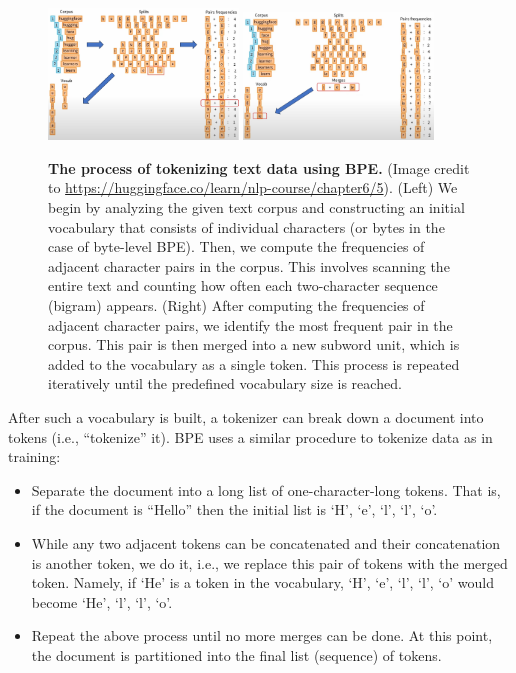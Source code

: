 \documentclass[../../book-main.tex]{subfiles}
\begin{document}
\begin{figure}
    \centering
    \includegraphics[width=0.45\textwidth]{figs_chap7/BPE1}\hspace{0.6in} 
    \includegraphics[width=0.45\textwidth]{figs_chap7/BPE2} 
    \caption{\small {\bf The process of tokenizing text data using BPE.} (Image credit to \url{https://huggingface.co/learn/nlp-course/chapter6/5}). (Left) We begin by analyzing the given text corpus and constructing an initial vocabulary that consists of individual characters (or bytes in the case of byte-level BPE). Then, we compute the frequencies of adjacent character pairs in the corpus. This involves scanning the entire text and counting how often each two-character sequence (bigram) appears. (Right) After computing the frequencies of adjacent character pairs, we identify the most frequent pair in the corpus. This pair is then merged into a new subword unit, which is added to the vocabulary as a single token. This process is repeated iteratively until the predefined vocabulary size is reached. }
    \label{fig:BPE}
\end{figure}
After such a vocabulary is built, a tokenizer can break down a document into tokens (i.e., ``tokenize'' it). BPE uses a similar procedure to tokenize data as in training:
\begin{itemize}
    \item Separate the document into a long list of one-character-long tokens. That is, if the document is ``Hello'' then the initial list is `H', `e', `l', `l', `o'. 
    \item While any two adjacent tokens can be concatenated and their concatenation is another token, we do it, i.e., we replace this pair of tokens with the merged token. Namely, if `He' is a token in the vocabulary, `H', `e', `l', `l', `o' would become `He', `l', `l', `o'.
    \item Repeat the above process until no more merges can be done. At this point, the document is partitioned into the final list (sequence) of tokens.
\end{itemize}
\end{document}
